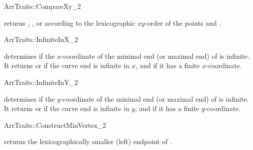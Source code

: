 \ccRefPageBegin
\begin{ccRefConcept}{ArrTraits::CompareXy_2}

\ccHasModels{}

  {returns , , or  according 
  to the lexicographic $xy$-order of the points  and .}
\end{ccRefConcept}
\ccRefPageEnd

\ccRefPageBegin
\begin{ccRefConcept}{ArrTraits::InfiniteInX_2}

\ccHasModels{}

  {determines if the $x$-coordinate of the minimal end (or maximal
  end) of  is infinite. It returns  or
   if the curve end is infinite in $x$, and
   if it has a finite $x$-coordinate.}
\end{ccRefConcept}
\ccRefPageEnd

\ccRefPageBegin
\begin{ccRefConcept}{ArrTraits::InfiniteInY_2}

\ccHasModels{}

  {determines if the $y$-coordinate of the minimal end (or 
  maximal end) of  is infinite. It returns 
  or  if the curve end is infinite in $y$, and 
   if it has a finite $y$-coordinate.}
\end{ccRefConcept}
\ccRefPageEnd

\ccRefPageBegin
\begin{ccRefConcept}{ArrTraits::ConstructMinVertex_2}

\ccHasModels{}

  {returns the lexicographically smaller (left) endpoint of .}
\end{ccRefConcept}
\ccRefPageEnd

